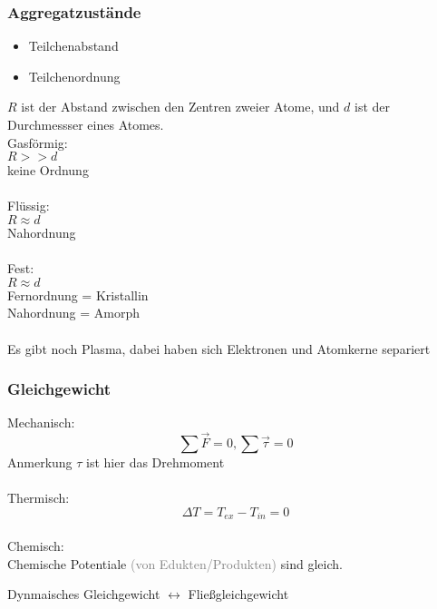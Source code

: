 \documentclass[a4paper, fleqn]{article}
\begin{document}
\subsubsection{Aggregatzustände}
\begin{itemize}
    \item Teilchenabstand
    \item Teilchenordnung
\end{itemize}
$R$ ist der Abstand zwischen den Zentren zweier Atome, und $d$ ist der Durchmessser eines Atomes.\\
Gasförmig:\\
$R >> d$\\
keine Ordnung\\
\\
Flüssig:\\
$R \approx d$\\
Nahordnung\\
\\
Fest:\\
$R \approx d$\\
Fernordnung = Kristallin\\
Nahordnung = Amorph\\
\\
Es gibt noch Plasma, dabei haben sich Elektronen und Atomkerne separiert\\
\subsubsection{Gleichgewicht}
Mechanisch:
\begin{equation*}
    \sum \vec{F} = 0, \sum \vec{\tau} = 0
\end{equation*}
Anmerkung $\tau$ ist hier das Drehmoment\\\\
Thermisch:
\begin{equation*}
    \Delta T = T_{ex} - T_{in} = 0
\end{equation*}
\\
Chemisch:\\
Chemische Potentiale \textcolor{gray}{(von Edukten/Produkten)} sind gleich.\\
\begin{center}
    Dynmaisches Gleichgewicht $\leftrightarrow$ Fließgleichgewicht
\end{center}
\end{document}
